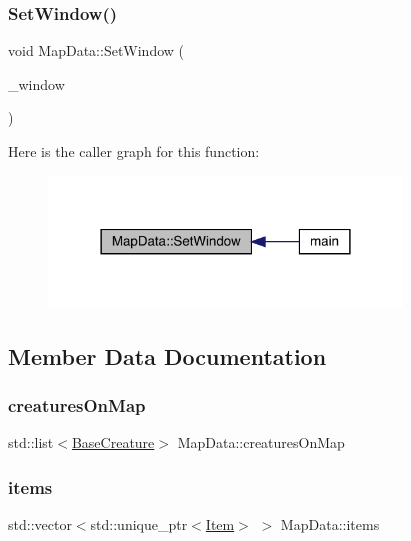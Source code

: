 \subsubsection{\texorpdfstring{Set\+Window()}{SetWindow()}}
{\footnotesize\ttfamily void Map\+Data\+::\+Set\+Window (\begin{DoxyParamCaption}\item[{sf\+::\+Render\+Window $\ast$}]{\+\_\+window }\end{DoxyParamCaption})}

Here is the caller graph for this function\+:
\nopagebreak
\begin{figure}[H]
\begin{center}
\leavevmode
\includegraphics[width=266pt]{class_map_data_a2c65f950748fe264276e292f8a5b92f5_icgraph}
\end{center}
\end{figure}


\subsection{Member Data Documentation}
\mbox{\label{class_map_data_a9a096967eb9377ffb6c3afd937540319}} 
\subsubsection{\texorpdfstring{creatures\+On\+Map}{creaturesOnMap}}
{\footnotesize\ttfamily std\+::list$<$\mbox{\hyperlink{class_base_creature}{Base\+Creature}}$>$ Map\+Data\+::creatures\+On\+Map}

\mbox{\label{class_map_data_a21cf5ee5508940f91b56046186aa6dec}} 
\subsubsection{\texorpdfstring{items}{items}}
{\footnotesize\ttfamily std\+::vector$<$std\+::unique\+\_\+ptr$<$\mbox{\hyperlink{class_item}{Item}}$>$ $>$ Map\+Data\+::items}

